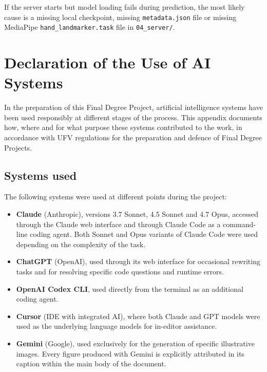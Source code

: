 If the server starts but model loading fails during prediction, the most likely cause is a missing
local checkpoint, missing \texttt{metadata.json} file or missing MediaPipe
\texttt{hand\_landmarker.task} file in \texttt{04\_server/}.

\clearpage
\chapter{Declaration of the Use of AI Systems}
\label{app:ai_declaration}

In the preparation of this Final Degree Project, artificial intelligence systems have been used
responsibly at different stages of the process. This appendix documents how, where and for what
purpose these systems contributed to the work, in accordance with UFV regulations for the
preparation and defence of Final Degree Projects.

\section*{Systems used}

The following systems were used at different points during the project:

\begin{itemize}
    \item \textbf{Claude} (Anthropic), versions 3.7 Sonnet, 4.5 Sonnet and 4.7 Opus,
          accessed through the Claude web interface and through Claude Code as a
          command-line coding agent. Both Sonnet and Opus variants of Claude Code
          were used depending on the complexity of the task.
    \item \textbf{ChatGPT} (OpenAI), used through its web interface for occasional
          rewriting tasks and for resolving specific code questions and runtime
          errors.
    \item \textbf{OpenAI Codex CLI}, used directly from the terminal as an
          additional coding agent.
    \item \textbf{Cursor} (IDE with integrated AI), where both Claude and GPT
          models were used as the underlying language models for in-editor
          assistance.
    \item \textbf{Gemini} (Google), used exclusively for the generation of
          specific illustrative images. Every figure produced with Gemini is
          explicitly attributed in its caption within the main body of the
          document.
\end{itemize}

